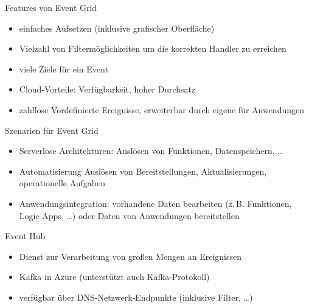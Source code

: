 \begin{flashcard}[]{Features von Event Grid}
  \begin{itemize}
    \item einfaches Aufsetzen (inklusive grafischer Oberfläche)
    \item Vielzahl von Filtermöglichkeiten um die korrekten Handler zu erreichen
    \item viele Ziele für ein Event
    \item Cloud-Vorteile: Verfügbarkeit, hoher Durchsatz
    \item zahllose Vordefinierte Ereignisse, erweiterbar durch eigene für Anwendungen
  \end{itemize}
\end{flashcard}

\begin{flashcard}[]{Szenarien für Event Grid}
  \begin{itemize}
    \item Serverlose Architekturen:\newline
      Auslösen von Funktionen, Datenspeichern, \ldots
    \item Automatisierung\newline
      Auslösen von Bereitstellungen, Aktualisierungen, operationelle Aufgaben
    \item Anwendungsintegration:\newline
      vorhandene Daten bearbeiten (z.\,B. Funktionen, Logic Apps, \ldots) oder Daten von Anwendungen bereitstellen
  \end{itemize}
\end{flashcard}

\begin{flashcard}[]{Event Hub}
  \begin{itemize}
    \item Dienst zur Verarbeitung von großen Mengen an Ereignissen
    \item Kafka in Azure (unterstützt auch Kafka-Protokoll)
    \item verfügbar über DNS-Netzwerk-Endpunkte (inklusive Filter, \ldots)
  \end{itemize}
\end{flashcard}

